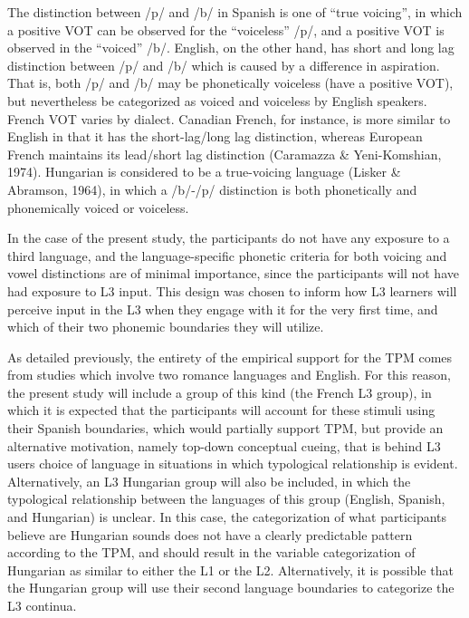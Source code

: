 \documentclass[
  english,
  man]{apa6}
\begin{document}
The distinction between /p/ and /b/ in Spanish is one of \enquote{true voicing}, in which a positive VOT can be observed for the \enquote{voiceless} /p/, and a positive VOT is observed in the \enquote{voiced} /b/.
English, on the other hand, has short and long lag distinction between /p/ and /b/ which is caused by a difference in aspiration.
That is, both /p/ and /b/ may be phonetically voiceless (have a positive VOT), but nevertheless be categorized as voiced and voiceless by English speakers.
French VOT varies by dialect.
Canadian French, for instance, is more similar to English in that it has the short-lag/long lag distinction, whereas European French maintains its lead/short lag distinction (Caramazza \& Yeni-Komshian, 1974).
Hungarian is considered to be a true-voicing language (Lisker \& Abramson, 1964), in which a /b/-/p/ distinction is both phonetically and phonemically voiced or voiceless.

In the case of the present study, the participants do not have any exposure to a third language, and the language-specific phonetic criteria for both voicing and vowel distinctions are of minimal importance, since the participants will not have had exposure to L3 input.
This design was chosen to inform how L3 learners will perceive input in the L3 when they engage with it for the very first time, and which of their two phonemic boundaries they will utilize.

As detailed previously, the entirety of the empirical support for the TPM comes from studies which involve two romance languages and English.
For this reason, the present study will include a group of this kind (the French L3 group), in which it is expected that the participants will account for these stimuli using their Spanish boundaries, which would partially support TPM, but provide an alternative motivation, namely top-down conceptual cueing, that is behind L3 users choice of language in situations in which typological relationship is evident.
Alternatively, an L3 Hungarian group will also be included, in which the typological relationship between the languages of this group (English, Spanish, and Hungarian) is unclear.
In this case, the categorization of what participants believe are Hungarian sounds does not have a clearly predictable pattern according to the TPM, and should result in the variable categorization of Hungarian as similar to either the L1 or the L2. Alternatively, it is possible that the Hungarian group will use their second language boundaries to categorize the L3 continua.
\end{document}
